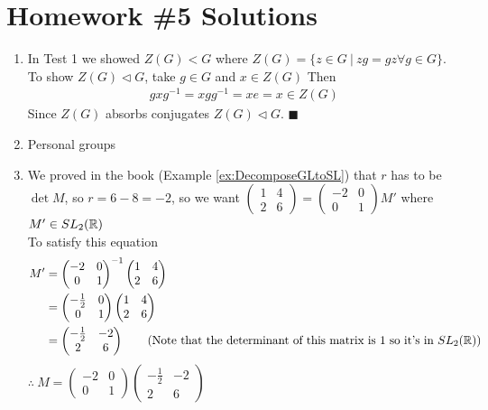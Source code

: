 \section{Homework \#5 Solutions}

\begin{enumerate}
    \item In Test 1 we showed $Z(G)<G$ where $Z(G)=\{z\in G \ | \ zg=gz \forall g \in G \}$. \\ 
    To show $Z(G)\triangleleft G$, take $g\in G$ and $x \in Z(G)$ 
    Then 
    \begin{align*}
        gxg^{-1} = xgg^{-1} = x e = x \in Z(G)
    \end{align*}
    Since $Z(G)$ absorbs conjugates $Z(G)\triangleleft G$. $\blacksquare$ 

    \item Personal groups
    \item We proved in the book (Example \ref{ex:DecomposeGLtoSL}) that $r$ has to be $\det M$, so $r=6-8 = -2$, so we want 
    $\begin{pmatrix}
        1 &4 \\ 2&6
    \end{pmatrix} = \begin{pmatrix}
        -2 & 0 \\ 0 & 1
    \end{pmatrix} M'$ where $M' \in SL_2({\mathbb{R}})$ \\
    To satisfy this equation 
    \begin{align*}
        M' &= \begin{pmatrix}
        -2 & 0 \\ 0 & 1
    \end{pmatrix}^{-1} \begin{pmatrix}
        1 &4 \\ 2&6
    \end{pmatrix} \\
    &= \begin{pmatrix}
        -\frac{1}{2} & 0 \\ 0 & 1
    \end{pmatrix}  \begin{pmatrix}
        1 &4 \\ 2&6
    \end{pmatrix} \\
    &= \begin{pmatrix}
        -\frac{1}{2} & -2 \\ 2 & 6
    \end{pmatrix} \ \ \ \ \ \ (\text{Note that the determinant of this matrix is }1 \text{ so it's in }SL_2({\mathbb{R}}))
    \end{align*}
    $\therefore \ M = \begin{pmatrix}
        -2 & 0 \\ 0 & 1
    \end{pmatrix} \begin{pmatrix}
        -\frac{1}{2} & -2 \\ 2 & 6
    \end{pmatrix}$


\end{enumerate}
